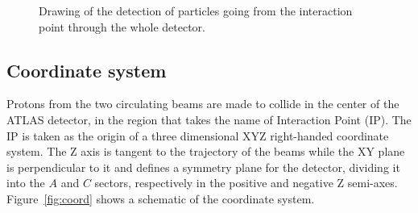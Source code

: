 \begin{figure}[htb]\begin{center}
	\caption{Drawing of the detection of particles going from the interaction point through the whole detector.\label{fig:detection}}
\end{center}\end{figure}


\subsection{Coordinate system}

Protons from the two circulating beams are made to collide in the center of the ATLAS detector, in the region
that takes the name of Interaction Point (IP). The IP is taken as the origin of a three dimensional XYZ right-handed
coordinate system. The Z axis is tangent to the trajectory of the beams while the XY plane is perpendicular to
it and defines a symmetry plane for the detector, dividing it into the $A$ and $C$ sectors, respectively in the
positive and negative Z semi-axes. Figure~\ref{fig:coord} shows a schematic of the coordinate system.

